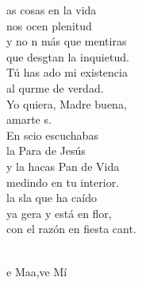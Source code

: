 \documentclass[12pt]{article}
\begin{document}
\begin{multicols*}{2}
\begin{cancion}%
	as cosas en la vida\\
	nos ocen plenitud\\
	y no n más que mentiras\\
	que desgtan la inquietud.\\
	Tú has ado mi existencia\\
	al qurme de verdad.\\
	Yo quiera, Madre buena,\\
	amarte s.	\\
\jump
	En scio escuchabas\\
	la Para de Jesús\\
	y la hacas Pan de Vida\\
	medindo en tu interior.\\
	la sla que ha caído\\
	ya gera y está en flor,\\
	con el razón en fiesta cant. \\\jump\\
	\begin{chorus}%
	e Maa,ve Mí\\
	\end{chorus}%
	\jump\\
\end{cancion}%


\end{multicols*}
\end{document}
